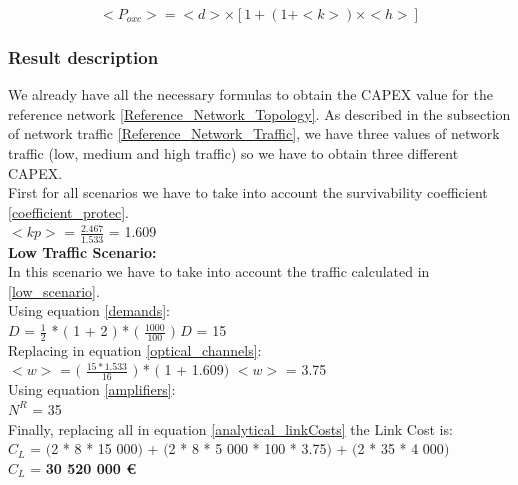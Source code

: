 \begin{equation}
<P_{oxc}> = <d> \times [1 + \left(1 + <k>\right) \times <h>]
\label{Poxc_transp_protec}
\end{equation}


\subsubsection{Result description}

We already have all the necessary formulas to obtain the CAPEX value for the reference network \ref{Reference_Network_Topology}. As described in the subsection of network traffic \ref{Reference_Network_Traffic}, we have three values of network traffic (low, medium and high traffic) so we have to obtain three different CAPEX.\\

First for all scenarios we have to take into account the survivability coefficient \ref{coefficient_protec}.\\

$<kp>$ = $\frac{2.467}{1.533}$ = 1.609\\

\textbf{Low Traffic Scenario:}\\
In this scenario we have to take into account the traffic calculated in \ref{low_scenario}.\\

Using equation \ref{demands}:\\

$D$ = $\frac{1}{2}$ * $($ 1 + 2 $)$ * $($ $\frac{1000}{100}$ $)$ \qquad \qquad $D$ = 15\\

Replacing in equation \ref{optical_channels}:\\

$<w>$ = $($ $\frac{15 * 1.533}{16}$ $)$ * $($ 1 + 1.609$)$ \qquad \qquad $<w>$ = 3.75\\

Using equation \ref{amplifiers}:\\

$N^R$ = 35\\

Finally, replacing all in equation \ref{analytical_linkCosts} the Link Cost is:\\

$C_L$ = $($2 * 8 * 15 000$)$ + $($2 * 8 * 5 000 * 100 * 3.75$)$ + $($2 * 35 * 4 000$)$\\

$C_L$ = \textbf{30 520 000 \euro}\\

